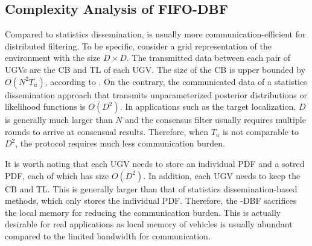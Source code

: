 	\subsection{Complexity Analysis of FIFO-DBF}
	Compared to statistics dissemination, {\proto} is usually more communication-efficient for distributed filtering. 
	To be specific, consider a grid representation of the environment with the size $D\times D$. %
	The transmitted data between each pair of UGVs are the CB and TL of each UGV.
	The size of the CB is upper bounded by $O(N^2T_u)$, according to .
	On the contrary, the communicated data of a statistics dissemination approach that transmits unparameterized posterior distributions or likelihood functions is $O(D^2)$.
	In applications such as the target localization, $D$ is generally much larger than $N$ and the consensus filter usually requires multiple rounds to arrive at consensual results.
	Therefore, when $T_u$ is not comparable to $D^2$, the {\proto} protocol requires much less communication burden.
	
	It is worth noting that each UGV needs to store an individual PDF and a sotred PDF, each of which has size $O(D^2)$. 
	In addition, each UGV needs to keep the CB and TL.
	This is generally larger than that of statistics dissemination-based methods, which only stores the individual PDF.
	Therefore, the \proto-DBF sacrifices the local memory for reducing the communication burden. 
	This is actually desirable for real applications as local memory of vehicles is usually abundant compared to the limited bandwidth for communication.
	
